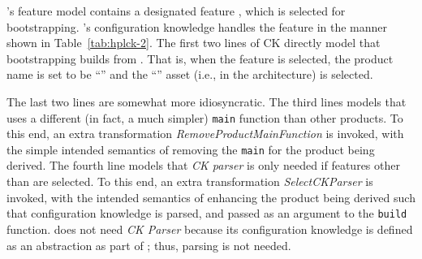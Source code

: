 
\hpl's feature model contains a designated feature \hp, which is selected for bootstrapping. \hpl's configuration knowledge handles the feature in the manner shown in Table~\ref{tab:hplck-2}. The first two lines of CK directly model that bootstrapping builds \hpproduct{} from \hpsplasset.  That is, when the \hp{} feature is selected, the product name is set to be ``\hp'' and the ``\hp'' asset (i.e., \hpsplasset{} in the architecture) is selected. 

The last two lines are somewhat more idiosyncratic. The third lines models that \hpproduct{} uses a different (in fact, a much simpler) \texttt{main} function than other products. To this end, an extra transformation \emph{RemoveProductMainFunction} is invoked, with the simple intended semantics of removing the \texttt{main} for the product being derived. The fourth line models that \emph{CK parser} is only needed if features other than \hp{} are selected. To this end, an extra transformation \emph{SelectCKParser} is invoked, with the intended semantics of enhancing the product being derived such that configuration knowledge is parsed, and passed as an argument to the \texttt{build} function. \hpproduct{} does not need \emph{CK Parser} because its configuration knowledge is defined as an abstraction as part of \hpsplasset; thus, parsing is not needed.

